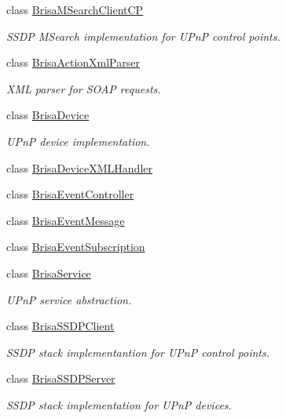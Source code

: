 \begin{DoxyCompactItemize}
class \hyperlink{classBrisaUpnp_1_1BrisaMSearchClientCP}{BrisaMSearchClientCP}
\begin{DoxyCompactList}\small\item\em SSDP MSearch implementation for UPnP control points. \item\end{DoxyCompactList}\item 
class \hyperlink{classBrisaUpnp_1_1BrisaActionXmlParser}{BrisaActionXmlParser}
\begin{DoxyCompactList}\small\item\em XML parser for SOAP requests. \item\end{DoxyCompactList}\item 
class \hyperlink{classBrisaUpnp_1_1BrisaDevice}{BrisaDevice}
\begin{DoxyCompactList}\small\item\em UPnP device implementation. \item\end{DoxyCompactList}\item 
class \hyperlink{classBrisaUpnp_1_1BrisaDeviceXMLHandler}{BrisaDeviceXMLHandler}
\item 
class \hyperlink{classBrisaUpnp_1_1BrisaEventController}{BrisaEventController}
\item 
class \hyperlink{classBrisaUpnp_1_1BrisaEventMessage}{BrisaEventMessage}
\item 
class \hyperlink{classBrisaUpnp_1_1BrisaEventSubscription}{BrisaEventSubscription}
\item 
class \hyperlink{classBrisaUpnp_1_1BrisaService}{BrisaService}
\begin{DoxyCompactList}\small\item\em UPnP service abstraction. \item\end{DoxyCompactList}\item 
class \hyperlink{classBrisaUpnp_1_1BrisaSSDPClient}{BrisaSSDPClient}
\begin{DoxyCompactList}\small\item\em SSDP stack implementantion for UPnP control points. \item\end{DoxyCompactList}\item 
class \hyperlink{classBrisaUpnp_1_1BrisaSSDPServer}{BrisaSSDPServer}
\begin{DoxyCompactList}\small\item\em SSDP stack implementation for UPnP devices. \item\end{DoxyCompactList}\end{DoxyCompactItemize}
